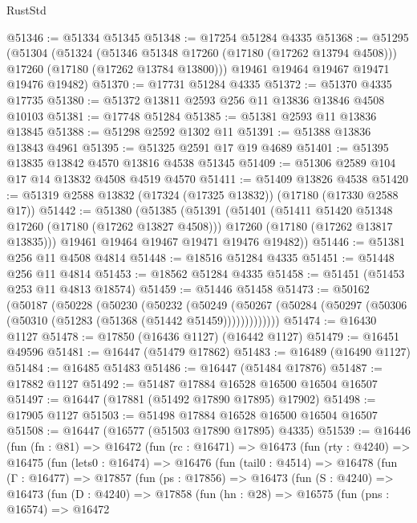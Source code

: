 \begin{lexlean}{RustStd}
\begin{coremodule}
{\begin{coremodule}
{{{{{{{{{{{{{{{{{{{{{{{{{{{{{{{{{{{{{{{{{{{{{{{{{{{{{{{@51346 := @51334 @51345
@51348 := @17254 @51284 @4335
@51368 := @51295
    (@51304
      (@51324
        (@51346 @51348 @17260 (@17180 (@17262 @13794 @4508)))
        @17260
        (@17180 (@17262 @13784 @13800)))
      @19461
      @19464
      @19467
      @19471
      @19476
      @19482)
@51370 := @17731 @51284 @4335
@51372 := @51370 @4335 @17735
@51380 := @51372 @13811 @2593 @256 @11 @13836 @13846 @4508 @10103
@51381 := @17748 @51284
@51385 := @51381 @2593 @11 @13836 @13845
@51388 := @51298 @2592 @1302 @11
@51391 := @51388 @13836 @13843 @4961
@51395 := @51325 @2591 @17 @19 @4689
@51401 := @51395 @13835 @13842 @4570 @13816 @4538 @51345
@51409 := @51306 @2589 @104 @17 @14 @13832 @4508 @4519 @4570
@51411 := @51409 @13826 @4538
@51420 := @51319 @2588 @13832 (@17324 (@17325 @13832)) (@17180 (@17330 @2588 @17))
@51442 := @51380
    (@51385
      (@51391
        (@51401
          (@51411 @51420 @51348 @17260 (@17180 (@17262 @13827 @4508)))
          @17260
          (@17180 (@17262 @13817 @13835)))
        @19461
        @19464
        @19467
        @19471
        @19476
        @19482))
@51446 := @51381 @256 @11 @4508 @4814
@51448 := @18516 @51284 @4335
@51451 := @51448 @256 @11 @4814
@51453 := @18562 @51284 @4335
@51458 := @51451 (@51453 @253 @11 @4813 @18574)
@51459 := @51446 @51458
@51473 := @50162
    (@50187
      (@50228
        (@50230
          (@50232
            (@50249
              (@50267 (@50284 (@50297 (@50306 (@50310 (@51283 (@51368 (@51442 @51459)))))))))))))
@51474 := @16430 @1127
@51478 := @17850 (@16436 @1127) (@16442 @1127)
@51479 := @16451 @49596
@51481 := @16447 (@51479 @17862)
@51483 := @16489 (@16490 @1127)
@51484 := @16485 @51483
@51486 := @16447 (@51484 @17876)
@51487 := @17882 @1127
@51492 := @51487 @17884 @16528 @16500 @16504 @16507
@51497 := @16447 (@17881 (@51492 @17890 @17895) @17902)
@51498 := @17905 @1127
@51503 := @51498 @17884 @16528 @16500 @16504 @16507
@51508 := @16447 (@16577 (@51503 @17890 @17895) @4335)
@51539 := @16446
    (fun (fn : @81) =>
    @16472
      (fun (rc : @16471) =>
      @16473
        (fun (rty : @4240) =>
        @16475
          (fun (lets0 : @16474) =>
          @16476
            (fun (tail0 : @4514) =>
            @16478
              (fun (Γ : @16477) =>
              @17857
                (fun (ps : @17856) =>
                @16473
                  (fun (S : @4240) =>
                  @16473
                    (fun (D : @4240) =>
                    @17858
                      (fun (hn : @28) =>
                      @16575
                        (fun (pns : @16574) =>
                        @16472
}}}}}}}}}}}}}}}}}}}}}}}}}}}}}}}}}}}}}}}}}}}}}}}}}}}}}}}
\end{coremodule}}
\end{coremodule}
\end{lexlean}
